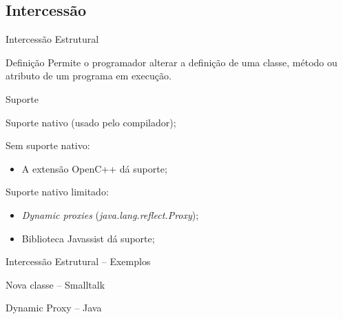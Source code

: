 \documentclass[12pt,t]{beamer}
\begin{document}
 	 \subsection{Intercessão}
 	 \begin{frame}{Intercessão Estrutural}
 	 	\begin{block}{Definição \cite{chiba2000load}}
 	 		Permite o programador alterar a definição de uma classe, método ou atributo de um programa em execução.
 	 	\end{block} 
 	 	\pause
 	 	\begin{block}{Suporte}
 	 		\begin{description}[Smalltalk:]
 	 			\item [Smalltalk:] Suporte nativo (usado pelo compilador);
 	 			\pause
 	 			\item [C++:] Sem suporte nativo:  
 	 				\begin{itemize}
		 	 			\item A extensão OpenC++ \cite{chiba1995metaobject} dá suporte;
		 	 		\end{itemize}
	 	 		\pause
 	 			\item [Java:] Suporte nativo limitado:
	 	 			\begin{itemize}
	 	 				\item \emph{Dynamic proxies} (\emph{java.lang.reflect.Proxy});
	 	 				\item Biblioteca Javassist \cite{chiba2000load} dá suporte;
	 	 			\end{itemize}
 	 		\end{description}
 	 	\end{block}
 	 \end{frame}
 	 \begin{frame}{Intercessão Estrutural -- Exemplos}
 	 	\begin{exampleblock}{Nova classe -- Smalltalk}
 	 		
 	 	\end{exampleblock}
 	 	\pause
 	 	\begin{exampleblock}{Dynamic Proxy -- Java}
 	 		
 	 	\end{exampleblock}
 	 \end{frame}
\end{document}
